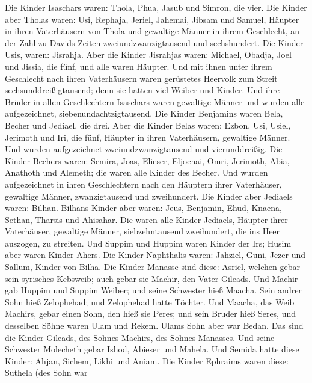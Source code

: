  Die Kinder Isaschars waren: Thola, Phua, Jasub und Simron,
die vier.  Die Kinder aber Tholas waren: Usi, Rephaja,
Jeriel, Jahemai, Jibsam und Samuel, Häupter in ihren Vaterhäusern von
Thola und gewaltige Männer in ihrem Geschlecht, an der Zahl zu Davids
Zeiten zweiundzwanzigtausend und sechshundert.  Die Kinder
Usis, waren: Jisrahja. Aber die Kinder Jisrahjas waren: Michael, Obadja,
Joel und Jissia, die fünf, und alle waren Häupter.  Und mit
ihnen unter ihrem Geschlecht nach ihren Vaterhäusern waren gerüstetes
Heervolk zum Streit sechsunddreißigtausend; denn sie hatten viel Weiber
und Kinder.  Und ihre Brüder in allen Geschlechtern
Isaschars waren gewaltige Männer und wurden alle aufgezeichnet,
siebenundachtzigtausend.  Die Kinder Benjamins waren Bela,
Becher und Jediael, die drei.  Aber die Kinder Belas waren:
Ezbon, Usi, Usiel, Jerimoth und Iri, die fünf, Häupter in ihren
Vaterhäusern, gewaltige Männer. Und wurden aufgezeichnet
zweiundzwanzigtausend und vierunddreißig.  Die Kinder
Bechers waren: Semira, Joas, Elieser, Eljoenai, Omri, Jerimoth, Abia,
Anathoth und Alemeth; die waren alle Kinder des Becher.  Und
wurden aufgezeichnet in ihren Geschlechtern nach den Häuptern ihrer
Vaterhäuser, gewaltige Männer, zwanzigtausend und zweihundert.
 Die Kinder aber Jediaels waren: Bilhan. Bilhans Kinder
aber waren: Jeus, Benjamin, Ehud, Knaena, Sethan, Tharsis und Ahisahar.
 Die waren alle Kinder Jediaels, Häupter ihrer Vaterhäuser,
gewaltige Männer, siebzehntausend zweihundert, die ins Heer auszogen, zu
streiten.  Und Suppim und Huppim waren Kinder der Irs;
Husim aber waren Kinder Ahers.  Die Kinder Naphthalis
waren: Jahziel, Guni, Jezer und Sallum, Kinder von Bilha. 
Die Kinder Manasse sind diese: Asriel, welchen gebar sein syrisches
Kebsweib; auch gebar sie Machir, den Vater Gileads.  Und
Machir gab Huppim und Suppim Weiber; und seine Schwester hieß Maacha.
Sein andrer Sohn hieß Zelophehad; und Zelophehad hatte Töchter.
 Und Maacha, das Weib Machirs, gebar einen Sohn, den hieß
sie Peres; und sein Bruder hieß Seres, und desselben Söhne waren Ulam
und Rekem.  Ulams Sohn aber war Bedan. Das sind die Kinder
Gileads, des Sohnes Machirs, des Sohnes Manasses.  Und
seine Schwester Molecheth gebar Ishod, Abieser und Mahela. 
Und Semida hatte diese Kinder: Ahjan, Sichem, Likhi und Aniam.
 Die Kinder Ephraims waren diese: Suthela (des Sohn war
